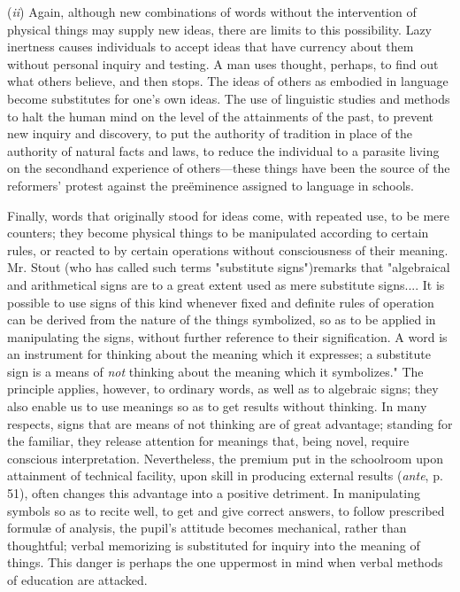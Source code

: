 \documentclass[letterpaper]{book}
\begin{document}

(\emph{ii}) Again, although new combinations of words without the
intervention of physical things may supply new ideas, there are limits
to this possibility. Lazy inertness causes individuals to accept ideas
that have currency about them without personal inquiry and testing. A
man uses thought, perhaps, to find out what others believe, and then
stops. The ideas of others as embodied in language become substitutes
for one's own ideas. The use of linguistic studies and methods to halt
the human mind on the level of the attainments of the past, to prevent
new inquiry and discovery, to put the authority of tradition in place of
the authority of natural facts and laws, to reduce the individual to a
parasite living on the secondhand experience of others---these things
have been the source of the reformers' protest against the preëminence
assigned to language in schools.


Finally, words that originally stood for ideas come, with repeated use,
to be mere counters; they become physical things to be manipulated
according to certain rules, or reacted to by certain operations without
consciousness of their meaning. Mr. Stout (who has called such terms
"substitute signs")remarks that "algebraical and arithmetical signs are
to a great extent used as mere substitute signs.... It is possible to
use signs of this kind whenever fixed and definite rules of
operation
can be derived from the nature of the things symbolized, so as to be
applied in manipulating the signs, without further reference to their
signification. A word is an instrument for thinking about the meaning
which it expresses; a substitute sign is a means of \emph{not} thinking
about the meaning which it symbolizes." The principle applies, however,
to ordinary words, as well as to algebraic signs; they also enable us to
use meanings so as to get results without thinking. In many respects,
signs that are means of not thinking are of great advantage; standing
for the familiar, they release attention for meanings that, being novel,
require conscious interpretation. Nevertheless, the premium put in the
schoolroom upon attainment of technical facility, upon skill in
producing external results (\emph{ante}, p. 51), often changes this
advantage into a positive detriment. In manipulating symbols so as to
recite well, to get and give correct answers, to follow prescribed
formulæ of analysis, the pupil's attitude becomes mechanical, rather
than thoughtful; verbal memorizing is substituted for inquiry into the
meaning of things. This danger is perhaps the one uppermost in mind when
verbal methods of education are attacked.
\end{document}
